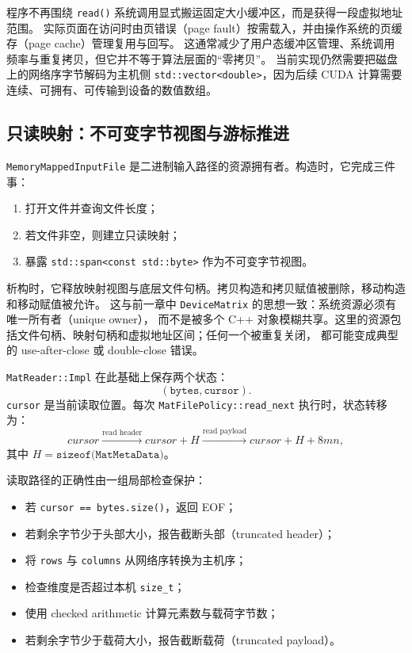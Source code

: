 程序不再围绕 \texttt{read()} 系统调用显式搬运固定大小缓冲区，而是获得一段虚拟地址范围。
实际页面在访问时由页错误（page fault）按需载入，并由操作系统的页缓存（page cache）管理复用与回写。
这通常减少了用户态缓冲区管理、系统调用频率与重复拷贝，但它并不等于算法层面的“零拷贝”。
当前实现仍然需要把磁盘上的网络序字节解码为主机侧 \texttt{std::vector<double>}，因为后续 CUDA 计算需要
连续、可拥有、可传输到设备的数值数组。


\subsection{只读映射：不可变字节视图与游标推进}

\texttt{MemoryMappedInputFile} 是二进制输入路径的资源拥有者。构造时，它完成三件事：

\begin{enumerate}
    \item 打开文件并查询文件长度；
    \item 若文件非空，则建立只读映射；
    \item 暴露 \texttt{std::span<const std::byte>} 作为不可变字节视图。
\end{enumerate}

析构时，它释放映射视图与底层文件句柄。拷贝构造和拷贝赋值被删除，移动构造和移动赋值被允许。
这与前一章中 \texttt{DeviceMatrix} 的思想一致：系统资源必须有唯一所有者（unique owner），
而不是被多个 C++ 对象模糊共享。这里的资源包括文件句柄、映射句柄和虚拟地址区间；任何一个被重复关闭，
都可能变成典型的 use-after-close 或 double-close 错误。

\texttt{MatReader::Impl} 在此基础上保存两个状态：
\[
    (\texttt{bytes},\texttt{cursor}).
\]
\texttt{cursor} 是当前读取位置。每次 \texttt{MatFilePolicy::read\_next} 执行时，状态转移为：
\[
    cursor
    \xrightarrow{\text{read header}}
    cursor + H
    \xrightarrow{\text{read payload}}
    cursor + H + 8mn,
\]
其中 $H=\texttt{sizeof(MatMetaData)}$。

读取路径的正确性由一组局部检查保护：

\begin{itemize}
    \item 若 \texttt{cursor == bytes.size()}，返回 EOF；
    \item 若剩余字节少于头部大小，报告截断头部（truncated header）；
    \item 将 \texttt{rows} 与 \texttt{columns} 从网络序转换为主机序；
    \item 检查维度是否超过本机 \texttt{size\_t}；
    \item 使用 checked arithmetic 计算元素数与载荷字节数；
    \item 若剩余字节少于载荷大小，报告截断载荷（truncated payload）。
\end{itemize}

